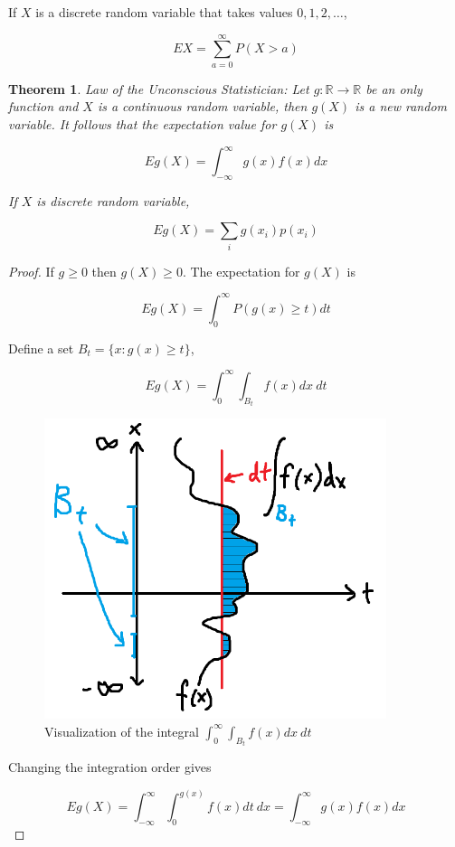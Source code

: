 \documentclass[12pt, a4paper]{article}
\newtheorem*{theorem}{Theorem}
\begin{document}
If $X$ is a discrete random variable that takes values $0, 1, 2, \dots$,

\[ EX=\sum_{a=0}^\infty P(X>a) \]

\begin{theorem}
Law of the Unconscious Statistician: Let $g : \mathbb{R} \to \mathbb{R}$ be an only function and $X$ is a continuous random variable, then $g(X)$ is a new random variable. It follows that the expectation value for $g(X)$ is

\[ Eg(X)=\int_{-\infty}^\infty g(x) f(x) dx \]

If $X$ is discrete random variable,

\[ Eg(X)=\sum_i g(x_i) p(x_i) \]
\end{theorem}

\begin{proof}
If $g \ge 0$ then $g(X)\ge0$. The expectation for $g(X)$ is

\[ Eg(X)=\int_0^\infty P(g(x)\ge t) dt \]

Define a set $B_t=\{ x : g(x)\ge t \}$,

\[ Eg(X)=\int_0^\infty \int_{B_t} f(x) dx \: dt \]

\begin{figure}[H]
\centering
\includegraphics[width=100mm]{20.png}
\caption{Visualization of the integral $\displaystyle\int_0^\infty \int_{B_t} f(x) dx \: dt$}
\end{figure}

Changing the integration order gives

\[ Eg(X)=\int_{-\infty}^\infty \int_0^{g(x)} f(x) dt \: dx = \int_{-\infty}^\infty g(x) f(x) dx \]
\end{proof}
\end{document}

